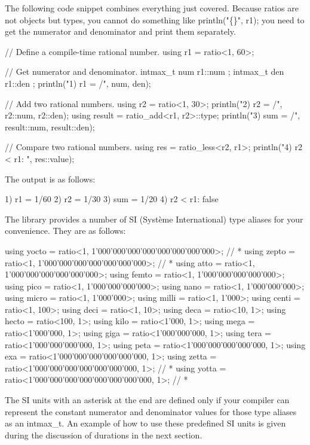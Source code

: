 The following code snippet combines everything just covered. Because ratios are not objects but types, you cannot do something like println("\{\}", r1); you need to get the numerator and denominator and print them separately.

\begin{cpp}
// Define a compile-time rational number.
using r1 = ratio<1, 60>;

// Get numerator and denominator.
intmax_t num { r1::num };
intmax_t den { r1::den };
println("1) r1 = {}/{}", num, den);

// Add two rational numbers.
using r2 = ratio<1, 30>;
println("2) r2 = {}/{}", r2::num, r2::den);
using result = ratio_add<r1, r2>::type;
println("3) sum = {}/{}", result::num, result::den);

// Compare two rational numbers.
using res = ratio_less<r2, r1>;
println("4) r2 < r1: {}", res::value);
\end{cpp}

The output is as follows:

\begin{shell}
1) r1 = 1/60
2) r2 = 1/30
3) sum = 1/20
4) r2 < r1: false
\end{shell}

The library provides a number of SI (Système International) type aliases for your convenience. They are as follows:

\begin{cpp}
using yocto = ratio<1, 1'000'000'000'000'000'000'000'000>; // *
using zepto = ratio<1, 1'000'000'000'000'000'000'000>; // *
using atto = ratio<1, 1'000'000'000'000'000'000>;
using femto = ratio<1, 1'000'000'000'000'000>;
using pico = ratio<1, 1'000'000'000'000>;
using nano = ratio<1, 1'000'000'000>;
using micro = ratio<1, 1'000'000>;
using milli = ratio<1, 1'000>;
using centi = ratio<1, 100>;
using deci = ratio<1, 10>;
using deca = ratio<10, 1>;
using hecto = ratio<100, 1>;
using kilo = ratio<1'000, 1>;
using mega = ratio<1'000'000, 1>;
using giga = ratio<1'000'000'000, 1>;
using tera = ratio<1'000'000'000'000, 1>;
using peta = ratio<1'000'000'000'000'000, 1>;
using exa = ratio<1'000'000'000'000'000'000, 1>;
using zetta = ratio<1'000'000'000'000'000'000'000, 1>; // *
using yotta = ratio<1'000'000'000'000'000'000'000'000, 1>; // *
\end{cpp}

The SI units with an asterisk at the end are defined only if your compiler can represent the constant numerator and denominator values for those type aliases as an intmax\_t. An example of how to use these predefined SI units is given during the discussion of durations in the next section.




